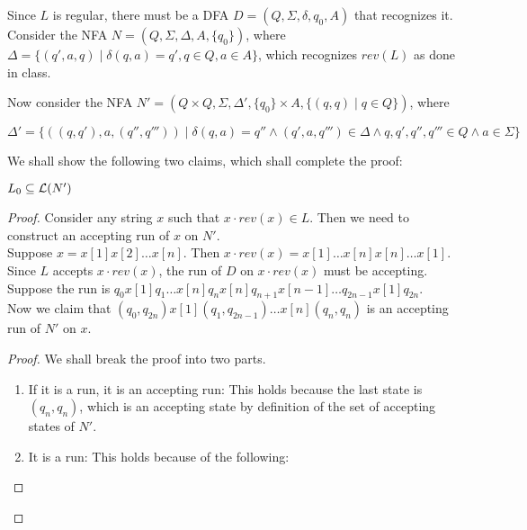 \begin{soln}

    Since $L$ is regular, there must be a DFA $D = (Q, \Sigma, \delta, q_0, A)$ that recognizes it. Consider the NFA $N = (Q, \Sigma, \Delta, A, \{q_0\})$, where $\Delta = \{(q', a, q) \mid \delta(q,
    a) = q', q \in Q, a \in A\}$, which recognizes $rev(L)$ as done in class.

    Now consider the NFA $N' = (Q \times Q, \Sigma, \Delta', \{q_0\} \times A, \{(q, q) \mid q \in Q\})$, where 

    $$\Delta' = \{((q, q'), a, (q'', q''')) \mid \delta(q, a) = q'' \land
    (q', a, q''') \in \Delta \land q, q', q'', q''' \in Q \land a \in \Sigma\}$$

    We shall show the following two claims, which shall complete the proof:\\

    \begin{claim}
        $L_0 \subseteq \mathcal{L}(N')$
    \end{claim}

    \begin{proof}
        Consider any string $x$ such that $x \cdot rev(x) \in L$. Then we need to construct an accepting run of $x$ on $N'$.\\

        Suppose $x = x[1] x[2] \ldots x[n]$. Then $x \cdot rev(x) = x[1] \ldots x[n] x[n] \ldots x[1]$. Since $L$ accepts $x \cdot rev(x)$, the run of $D$ on $x \cdot rev(x)$ must be accepting.
        Suppose the run is $q_0 x[1] q_1 \ldots x[n] q_n x[n] q_{n+1} x[n - 1] \ldots q_{2n-1} x[1] q_{2n}$.\\

        Now we claim that $(q_0, q_{2n}) x[1] (q_1, q_{2n-1}) \ldots x[n] (q_n, q_n)$ is an accepting run of $N'$ on $x$.\\

        \begin{proof}
            We shall break the proof into two parts.
            \begin{enumerate}
                \item If it is a run, it is an accepting run: This holds because the last state is $(q_n, q_n)$, which is an accepting state by definition of the set of accepting states of $N'$.
                \item It is a run: This holds because of the following:


\end{enumerate}
\end{proof}
\end{proof}
\end{soln}
